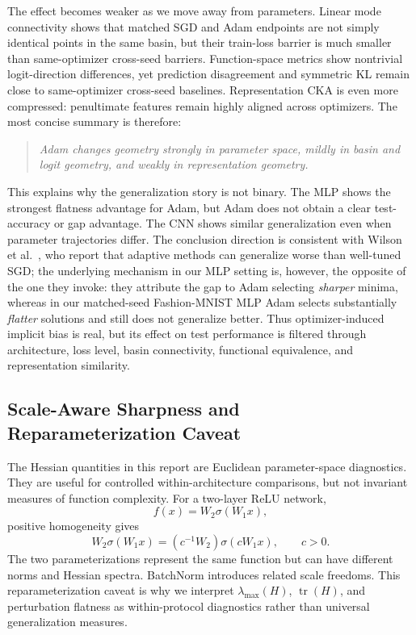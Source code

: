 \documentclass[11pt]{article}
\begin{document}
The effect becomes weaker as we move away from parameters. Linear mode connectivity shows that matched SGD and Adam endpoints are not simply identical points in the same basin, but their train-loss barrier is much smaller than same-optimizer cross-seed barriers. Function-space metrics show nontrivial logit-direction differences, yet prediction disagreement and symmetric KL remain close to same-optimizer cross-seed baselines. Representation CKA is even more compressed: penultimate features remain highly aligned across optimizers. The most concise summary is therefore:
\begin{quote}
\emph{Adam changes geometry strongly in parameter space, mildly in basin and logit geometry, and weakly in representation geometry.}
\end{quote}
This explains why the generalization story is not binary. The MLP shows the strongest flatness advantage for Adam, but Adam does not obtain a clear test-accuracy or gap advantage. The CNN shows similar generalization even when parameter trajectories differ. The conclusion direction is consistent with Wilson et al.~\cite{wilson2017marginal}, who report that adaptive methods can generalize worse than well-tuned SGD; the underlying mechanism in our MLP setting is, however, the opposite of the one they invoke: they attribute the gap to Adam selecting \emph{sharper} minima, whereas in our matched-seed Fashion-MNIST MLP Adam selects substantially \emph{flatter} solutions and still does not generalize better. Thus optimizer-induced implicit bias is real, but its effect on test performance is filtered through architecture, loss level, basin connectivity, functional equivalence, and representation similarity.

\subsection{Scale-Aware Sharpness and Reparameterization Caveat}
\label{sec:normalized-sharpness}

The Hessian quantities in this report are Euclidean parameter-space diagnostics. They are useful for controlled within-architecture comparisons, but not invariant measures of function complexity. For a two-layer ReLU network,
\[
f(x)=W_2\sigma(W_1x),
\]
positive homogeneity gives
\[
W_2\sigma(W_1x)=(c^{-1}W_2)\sigma(cW_1x),\qquad c>0.
\]
The two parameterizations represent the same function but can have different norms and Hessian spectra. BatchNorm introduces related scale freedoms. This reparameterization caveat \cite{dinh2017sharp} is why we interpret $\lambda_{\max}(H)$, $\operatorname{tr}(H)$, and perturbation flatness as within-protocol diagnostics rather than universal generalization measures.
\end{document}
